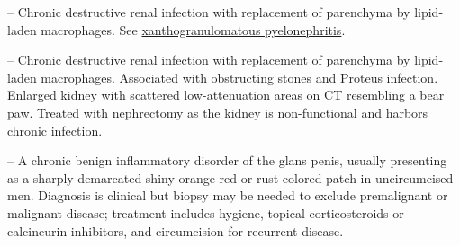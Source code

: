 -- Chronic destructive renal infection with replacement of parenchyma by lipid-laden macrophages. See \hyperlink{Xanthogranulomatous Pyelonephritis}{xanthogranulomatous pyelonephritis}.

-- Chronic destructive renal infection with replacement of parenchyma by lipid-laden macrophages. Associated with obstructing stones and Proteus infection. Enlarged kidney with scattered low-attenuation areas on CT resembling a bear paw. Treated with nephrectomy as the kidney is non-functional and harbors chronic infection.

-- A chronic benign inflammatory disorder of the glans penis, usually presenting as a sharply demarcated shiny orange-red or rust-colored patch in uncircumcised men. Diagnosis is clinical but biopsy may be needed to exclude premalignant or malignant disease; treatment includes hygiene, topical corticosteroids or calcineurin inhibitors, and circumcision for recurrent disease.
